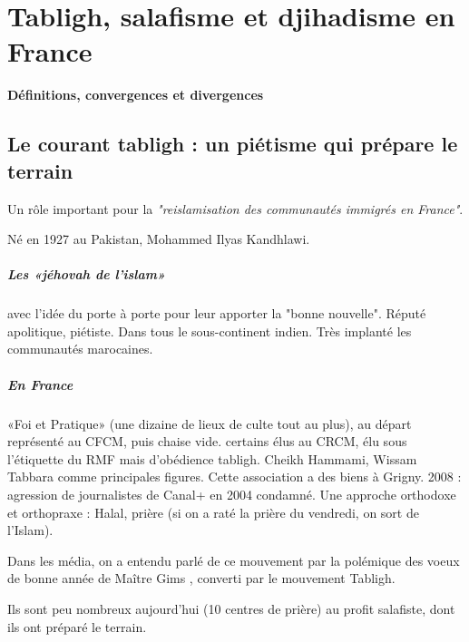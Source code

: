 
\chapter{Tabligh, salafisme et djihadisme en France }
\textbf{Définitions, convergences et
divergences}



\section{ Le courant tabligh : un piétisme qui prépare le terrain}

Un rôle important pour la \emph{"reislamisation des communautés immigrés en France"}.

Né en 1927 au Pakistan, Mohammed Ilyas Kandhlawi. \paragraph{Les «jéhovah de l’islam» } avec l'idée du porte à porte pour leur apporter la "bonne nouvelle". Réputé apolitique, piétiste. Dans tous le sous-continent indien. Très implanté les communautés marocaines. 
\paragraph{En France}  «Foi et Pratique» (une dizaine de lieux de culte tout au plus), au départ représenté au CFCM, puis chaise vide. certains élus au CRCM, élu sous l'étiquette du RMF mais d'obédience tabligh. Cheikh Hammami, Wissam Tabbara comme principales figures.
Cette association a des biens à Grigny.
2008 : agression de journalistes de Canal+ en 2004 condamné.
Une approche orthodoxe et orthopraxe : Halal, prière (si on a raté la prière du vendredi, on sort de l'Islam). 


Dans les média, on a entendu parlé de ce mouvement par la polémique des voeux de bonne année de Maître Gims , converti par le mouvement Tabligh. 

\begin{Synthesis}
Ils sont peu nombreux aujourd'hui (10 centres de prière) au profit salafiste, dont ils ont préparé le terrain.
\end{Synthesis}


